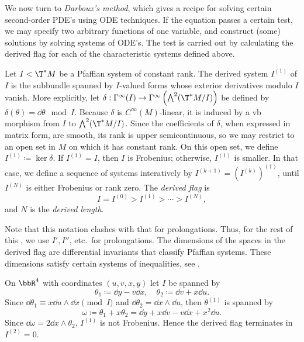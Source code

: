 We now turn to \emph{Darboux's method}, which gives a recipe for solving certain second-order PDE's using ODE techniques. If the equation passes a certain test, we may specify two arbitrary functions of one variable, and construct (some) solutions by solving systems of ODE's. The test is carried out by calculating the derived flag for each of the characteristic systems defined above.


\begin{defn}
    Let $I<\T^\ast M$ be a Pfaffian system of constant rank. The derived system $I^{(1)}$ of $I$ is the subbundle spanned by $I$-valued forms whose exterior derivatives modulo $I$ vanish. More explicitly, let $\delta:\Gamma^\infty(I)\to \Gamma^\infty\left(\bigwedge^2(\T^\ast M\slash I)\right)$ be defined by $\delta(\theta)=\dd\theta\mod I$. Because $\delta$ is $C^\infty(M)$-linear, it is induced by a \gls{vb} morphism from $I$ to $\bigwedge^2(\T^\ast M\slash I)$. Since the coefficients of $\delta$, when expressed in matrix form, are smooth, its rank is upper semicontinuous, so we may restrict to an open set in $M$ on which it has constant rank. On this open set, we define $I^{(1)}\coloneqq \ker\delta$. If $I^{(1)}=I$, then $I$ is Frobenius; otherwise, $I^{(1)}$ is smaller. In that case, we define a sequence of systems interatively by $I^{(k+1)}=(I^{(k)})^{(1)}$, until $I^{(N)}$ is either Frobenius or rank zero. The \emph{derived flag} is 
    \[I=I^{(0)}> I^{(1)}>\cdots >I^{(N)},\]
    and $N$ is the \emph{derived length}.
\end{defn}

Note that this notation clashes with that for prolongations. Thus, for the rest of this \subsect, we use $I',I''$, etc.\ for prolongations. The dimensions of the spaces in the derived flag are differential invariants that classify Pfaffian systems. These dimensions satisfy certain systems of inequalities, see \cite{Bryant}.

\begin{example}
    On $\bbR^4$ with coordinates $(u,v,x,y)$ let $I$ be spanned by 
    \[\theta_1\coloneqq \dd y-v\dd x,\quad \theta_2\coloneqq \dd v+x\dd u.\]
    Since $\dd\theta_1\equiv x\dd u\wedge \dd x\pmod{I}$ and $\dd\theta_2=\dd x\wedge\dd u$, then $\theta^{(1)}$ is spanned by 
    \[\omega\coloneqq \theta_1+x\theta_2=\dd y+x\dd v-v \dd x+x^2\dd u.\]
    Since $\dd\omega=2\dd x\wedge\theta_2$, $I^{(1)}$ is not Frobenius. Hence the derived flag terminates in $I^{(2)}=0$.
\end{example}


